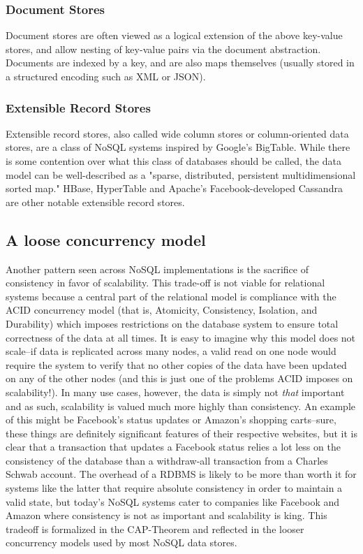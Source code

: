 \documentclass[11pt,a4paper]{report}
\begin{document}
 
\subsubsection{Document Stores}
Document stores are often viewed as a logical extension of the above key-value stores, and allow nesting of key-value pairs via the document abstraction. Documents are indexed by a key, and are also maps themselves (usually stored in a structured encoding such as XML or JSON).


 
\subsubsection{Extensible Record Stores}
Extensible record stores, also called wide column stores or column-oriented data stores, are a class of NoSQL systems inspired by Google's BigTable. While there is some contention over what this class of databases should be called, the data model can be well-described as a "sparse, distributed, persistent multidimensional sorted map."\cite{chang2008bigtable} HBase, HyperTable and Apache's Facebook-developed Cassandra are other notable extensible record stores.


\subsection{A loose concurrency model}
Another pattern seen across NoSQL implementations is the sacrifice of consistency in favor of scalability. This trade-off is not viable for relational systems because a central part of the relational model is compliance with the ACID concurrency model (that is, Atomicity, Consistency, Isolation, and Durability) which imposes restrictions on the database system to ensure total correctness of the data at all times. It is easy to imagine why this model does not scale--if data is replicated across many nodes, a valid read on one node would require the system to verify that no other copies of the data have been updated on any of the other nodes (and this is just one of the problems ACID imposes on scalability!).  In many use cases, however, the data is simply not \textit{that} important and as such, scalability is valued much more highly than consistency. An example of this might be Facebook's status updates or Amazon's shopping carts--sure, these things are definitely significant features of their respective websites, but it is clear that a transaction that updates a Facebook status relies a lot less on the consistency of the database than a withdraw-all transaction from a Charles Schwab account. The overhead of a RDBMS is likely to be more than worth it for systems like the latter that require absolute consistency in order to maintain a valid state, but today's NoSQL systems cater to companies like Facebook and Amazon where consistency is not as important and scalability is king. This tradeoff is formalized in the CAP-Theorem and reflected in the looser concurrency models used by most NoSQL data stores.
\end{document}
